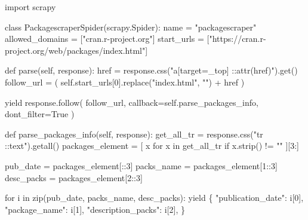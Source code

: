 \documentclass[
  12pt,
  a4paper,
]{scrreprt}
\newenvironment{Shaded}{}{}
\newcommand{\BuiltInTok}[1]{\textcolor[rgb]{0.84,0.23,0.29}{#1}}
\newcommand{\ControlFlowTok}[1]{\textcolor[rgb]{0.84,0.23,0.29}{#1}}
\newcommand{\DecValTok}[1]{\textcolor[rgb]{0.00,0.36,0.77}{#1}}
\newcommand{\ImportTok}[1]{\textcolor[rgb]{0.01,0.18,0.38}{#1}}
\newcommand{\KeywordTok}[1]{\textcolor[rgb]{0.84,0.23,0.29}{#1}}
\newcommand{\NormalTok}[1]{\textcolor[rgb]{0.14,0.16,0.18}{#1}}
\newcommand{\OperatorTok}[1]{\textcolor[rgb]{0.14,0.16,0.18}{#1}}
\newcommand{\StringTok}[1]{\textcolor[rgb]{0.01,0.18,0.38}{#1}}
\newcommand{\VariableTok}[1]{\textcolor[rgb]{0.89,0.38,0.04}{#1}}
\begin{document}
\begin{Shaded}
\begin{Highlighting}[]
\ImportTok{import}\NormalTok{ scrapy}


\KeywordTok{class}\NormalTok{ PackagescraperSpider(scrapy.Spider):}
\NormalTok{    name }\OperatorTok{=} \StringTok{"packagescraper"}
\NormalTok{    allowed\_domains }\OperatorTok{=}\NormalTok{ [}\StringTok{"cran.r{-}project.org"}\NormalTok{]}
\NormalTok{    start\_urls }\OperatorTok{=}\NormalTok{ [}\StringTok{"https://cran.r{-}project.org/web/packages/index.html"}\NormalTok{]}

    \KeywordTok{def}\NormalTok{ parse(}\VariableTok{self}\NormalTok{, response):}
\NormalTok{        href }\OperatorTok{=}\NormalTok{ response.css(}\StringTok{"a[target=\_top] ::attr(href)"}\NormalTok{).get()}
\NormalTok{        follow\_url }\OperatorTok{=}\NormalTok{ (}
          \VariableTok{self}\NormalTok{.start\_urls[}\DecValTok{0}\NormalTok{].replace(}\StringTok{"index.html"}\NormalTok{, }\StringTok{""}\NormalTok{) }\OperatorTok{+}\NormalTok{ href}
\NormalTok{        )}

        \ControlFlowTok{yield}\NormalTok{ response.follow(}
\NormalTok{            follow\_url,}
\NormalTok{            callback}\OperatorTok{=}\VariableTok{self}\NormalTok{.parse\_packages\_info,}
\NormalTok{            dont\_filter}\OperatorTok{=}\VariableTok{True}
\NormalTok{        )}

    \KeywordTok{def}\NormalTok{ parse\_packages\_info(}\VariableTok{self}\NormalTok{, response):}
\NormalTok{        get\_all\_tr }\OperatorTok{=}\NormalTok{ response.css(}\StringTok{"tr ::text"}\NormalTok{).getall()}
\NormalTok{        packages\_element }\OperatorTok{=}\NormalTok{ [}
\NormalTok{          x }\ControlFlowTok{for}\NormalTok{ x }\KeywordTok{in}\NormalTok{ get\_all\_tr }\ControlFlowTok{if}\NormalTok{ x.strip() }\OperatorTok{!=} \StringTok{""}
\NormalTok{        ][}\DecValTok{3}\NormalTok{:]}

\NormalTok{        pub\_date }\OperatorTok{=}\NormalTok{ packages\_element[::}\DecValTok{3}\NormalTok{]}
\NormalTok{        packs\_name }\OperatorTok{=}\NormalTok{ packages\_element[}\DecValTok{1}\NormalTok{::}\DecValTok{3}\NormalTok{]}
\NormalTok{        desc\_packs }\OperatorTok{=}\NormalTok{ packages\_element[}\DecValTok{2}\NormalTok{::}\DecValTok{3}\NormalTok{]}

        \ControlFlowTok{for}\NormalTok{ i }\KeywordTok{in} \BuiltInTok{zip}\NormalTok{(pub\_date, packs\_name, desc\_packs):}
            \ControlFlowTok{yield}\NormalTok{ \{}
                \StringTok{"publication\_date"}\NormalTok{: i[}\DecValTok{0}\NormalTok{],}
                \StringTok{"package\_name"}\NormalTok{: i[}\DecValTok{1}\NormalTok{],}
                \StringTok{"description\_packs"}\NormalTok{: i[}\DecValTok{2}\NormalTok{],}
\NormalTok{            \}}
\end{Highlighting}
\end{Shaded}
\end{document}

